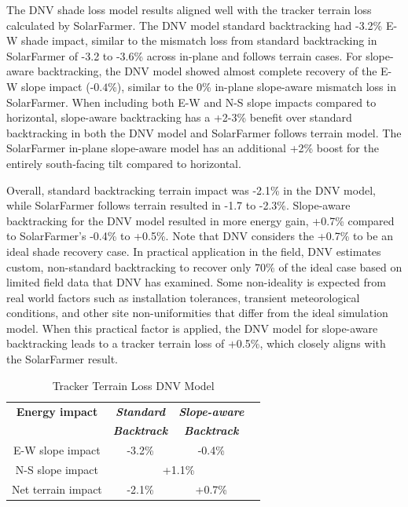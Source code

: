 \documentclass[conference]{IEEEtran}
\begin{document}
The DNV shade loss model results aligned well with the tracker terrain loss calculated by SolarFarmer. The DNV model standard backtracking had -3.2\% E-W shade impact, similar to the mismatch loss from standard backtracking in SolarFarmer of -3.2 to -3.6\% across in-plane and follows terrain cases. For slope-aware backtracking, the DNV model showed almost complete recovery of the E-W slope impact ($\text{-}0.4$\%), similar to the 0\% in-plane slope-aware mismatch loss in SolarFarmer. When including both E-W and N-S slope impacts compared to horizontal, slope-aware backtracking has a +2-3\% benefit over standard backtracking in both the DNV model and SolarFarmer follows terrain model. The SolarFarmer in-plane slope-aware model has an additional +2\% boost for the entirely south-facing tilt compared to horizontal.    

Overall, standard backtracking terrain impact was -2.1\% in the DNV model, while SolarFarmer follows terrain resulted in -1.7 to -2.3\%. Slope-aware backtracking for the DNV model resulted in more energy gain, +0.7\% compared to SolarFarmer's -0.4\% to +0.5\%. Note that DNV considers the +0.7\% to be an ideal shade recovery case. In practical application in the field, DNV estimates custom, non-standard backtracking to recover only 70\% of the ideal case based on limited field data that DNV has examined. Some non-ideality is expected from real world factors such as installation tolerances, transient meteorological conditions, and other site non-uniformities that differ from the ideal simulation model. When this practical factor is applied, the DNV model for slope-aware backtracking leads to a tracker terrain loss of +0.5\%, which closely aligns with the SolarFarmer result.

\begin{table}[htbp]
\caption{Tracker Terrain Loss DNV Model}
\begin{center}
\begin{tabular}{|c|c|c|c|}
\hline
\textbf{Energy impact}& \textbf{\textit{Standard}}& \textbf{\textit{Slope-aware}} \\
  & \textbf{\textit{Backtrack}} & \textbf{\textit{Backtrack}} \\
\hline
E-W slope impact & -3.2\% & -0.4\% \\
\hline
N-S slope impact  & \multicolumn{2}{|c|}{+1.1\%}\\
\hline
Net terrain impact & -2.1\% & +0.7\% \\
\hline
\end{tabular}
\label{table:uneven-terrain}
\end{center}
\end{table}
\end{document}
